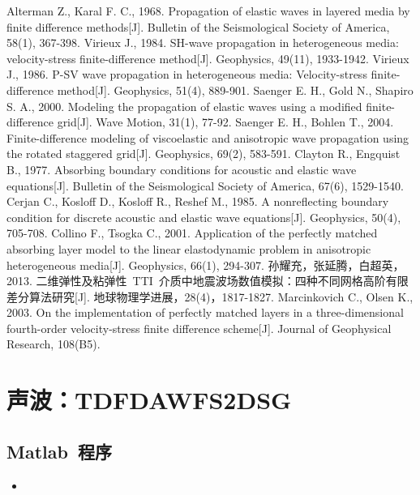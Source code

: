 \documentclass[UTF8]{ctexart}
\renewcommand{\thesection}{\chinese{section}、\kern -1em}                                            %
\newcommand{\insertMcode}[2]{\begin{itemize}\item[]\end{itemize}}
\begin{document}
\newpage
\begin{thebibliography}{9}
Alterman Z., Karal F. C., 1968. Propagation of elastic waves in layered media by finite difference methods[J]. Bulletin of the Seismological Society of America, 58(1), 367-398.
Virieux J., 1984. SH-wave propagation in heterogeneous media: velocity-stress finite-difference method[J]. Geophysics, 49(11), 1933-1942.
Virieux J., 1986. P-SV wave propagation in heterogeneous media: Velocity-stress finite-difference method[J]. Geophysics, 51(4), 889-901.
Saenger E. H., Gold N., Shapiro S. A., 2000. Modeling the propagation of elastic waves using a modified finite-difference grid[J]. Wave Motion, 31(1), 77-92.
Saenger E. H., Bohlen T., 2004. Finite-difference modeling of viscoelastic and anisotropic wave propagation using the rotated staggered grid[J]. Geophysics, 69(2), 583-591.
Clayton R., Engquist B., 1977. Absorbing boundary conditions for acoustic and elastic wave equations[J]. Bulletin of the Seismological Society of America, 67(6), 1529-1540.
Cerjan C., Kosloff D., Kosloff R., Reshef M., 1985. A nonreflecting boundary condition for discrete acoustic and elastic wave equations[J]. Geophysics, 50(4), 705-708.
Collino F., Tsogka C., 2001. Application of the perfectly matched absorbing layer model to the linear elastodynamic problem in anisotropic heterogeneous media[J]. Geophysics, 66(1), 294-307.
孙耀充，张延腾，白超英，2013. 二维弹性及粘弹性~TTI~介质中地震波场数值模拟：四种不同网格高阶有限差分算法研究[J]. 地球物理学进展，28(4)，1817-1827.
Marcinkovich C., Olsen K., 2003. On the implementation of perfectly matched layers in a three-dimensional fourth-order velocity-stress finite difference scheme[J]. Journal of Geophysical Research, 108(B5).
\end{thebibliography}

\newpage
\setmonofont{Consolas}                           %
\setsansfont{Consolas}                           %
\setmainfont{Consolas}                           %

\appendix
\renewcommand{\thesection}{附录\kern 0em}
\section{声波：TDFDAWFS2DSG}
\subsection{Matlab~程序}
\insertMcode{./Code/TDFDAWFS2DSG.m}{}
\end{document}
